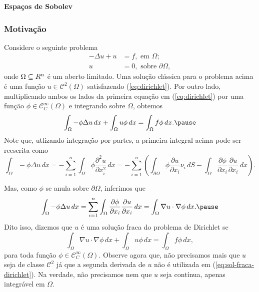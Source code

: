 \documentclass[xcolor=dvipsnames, aspectratio=169, 10pt]{beamer}
\let\mathbb\relax
\newcommand{\bR}{\mathbb{R}}
\newcommand{\cC}{\mathcal{C}}
\begin{document}
\begin{frame}
    \begin{center}
        \bfseries\huge Espaços de Sobolev
    \end{center}
\end{frame}
\begin{frame}
    \frametitle{Motivação}
    Considere o seguinte problema
    \begin{equation} \label{eq:dirichlet}
        \begin{aligned}
            -\Delta u + u &= f, \text{ em } \Omega;\\
            u &= 0, \text{ sobre } \partial\Omega,
        \end{aligned}
    \end{equation}
    onde $\Omega \subseteq \bR^n$ é um aberto limitado. \pause
    Uma solução clássica para o problema acima é uma função $u \in \cC^2(\Omega)$ satisfazendo (\ref{eq:dirichlet}). \pause
    Por outro lado, multiplicando ambos os lados da primeira equação em (\ref{eq:dirichlet}) por uma função $\phi \in \cC^{\infty}_C(\Omega)$ e integrando sobre $\Omega$, obtemos
    \[
        \int_{\Omega} - \phi \Delta u \,dx + \int_{\Omega} u \phi \,dx = \int_{\Omega} f \phi \,dx. \pause
    \]
    Note que, utlizando integração por partes, a primeira integral acima pode ser reescrita como
    \[
        \int_{\Omega} -\phi \Delta u \,dx = -\sum_{i=1}^n \int_{\Omega} \phi \frac{\partial^2 u}{\partial x_i^2} \,dx = -\sum_{i=1}^n \left( \int_{\partial\Omega} \phi \frac{\partial u}{\partial x_i} \nu_i \,dS - \int_{\Omega} \frac{\partial \phi}{\partial x_i} \frac{\partial u}{\partial x_i} \,dx\right).
    \]
\end{frame}
\begin{frame}
    Mas, como $\phi$ se anula sobre $\partial \Omega$, inferimos que
    \[
        \int_{\Omega} -\phi \Delta u \,dx = \sum_{i=1}^n \int_{\Omega} \frac{\partial \phi}{\partial x_i} \frac{\partial u}{\partial x_i} \,dx = \int_{\Omega} \nabla u \cdot \nabla \phi \,dx. \pause
    \]
    Dito isso, dizemos que $u$ é uma solução fraca do problema de Dirichlet se
    \begin{equation} \label{eq:sol-fraca-dirichlet}
        \int_{\Omega} \nabla u \cdot \nabla \phi \,dx + \int_{\Omega} u\phi \,dx = \int_{\Omega} f \phi \,dx,
    \end{equation}
    para toda função $\phi \in \cC^{\infty}_C(\Omega)$. \pause
    Observe agora que, não precisamos mais que $u$ seja de classe $\cC^2$ já que a segunda derivada de $u$ não é utilizada em (\ref{eq:sol-fraca-dirichlet}). Na verdade, não precisamos nem que $u$ seja contínua, apenas integrável em $\Omega$.
\end{frame}
\end{document}
